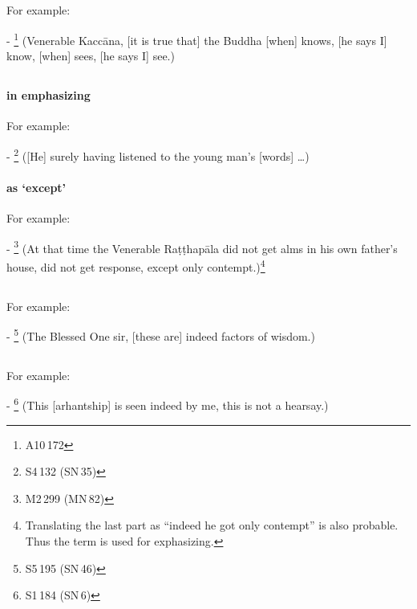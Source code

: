 \subsection*{}\label{nip:addhaa}
For example:\par
- \footnote{A10\,172} (Venerable Kacc\=ana, [it is true that] the Buddha [when] knows, [he says I] know, [when] sees, [he says I] see.) \par

\subsection*{}\label{nip:aynynadatthu}
\paragraph*{ in emphasizing} For example:\par
- \footnote{S4\,132 (SN\,35)} ([He] surely having listened to the young man's [words] \ldots) \par
\paragraph*{ as `except'} For example:\par
- \footnote{M2\,299 (MN\,82)} (At that time the Venerable Ra\d t\d thap\=ala did not get alms in his own father's house, did not get response, except only contempt.)\footnote{Translating the last part as ``indeed he got only contempt'' is also probable. Thus the term is used for exphasizing.} \par

\subsection*{}\label{nip:taggha}
For example:\par
- \footnote{S5\,195 (SN\,46)} (The Blessed One sir, [these are] indeed factors of wisdom.) \par

\subsection*{}\label{nip:jaatu}
For example:\par
- \footnote{S1\,184 (SN\,6)} (This [arhant\-ship] is seen indeed by me, this is not a hearsay.) \par

